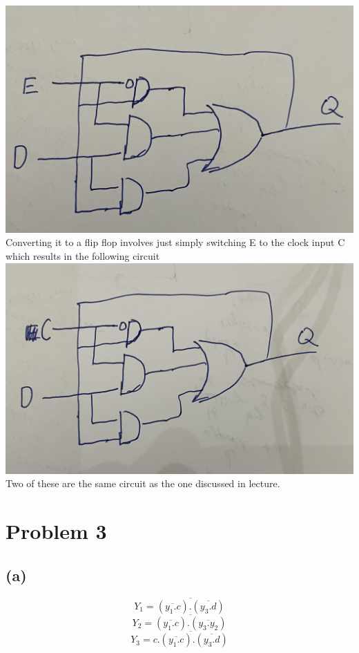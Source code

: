 \documentclass[12pt]{article}
\begin{document}
\includegraphics[scale=0.25]{Fig4.jpg}\\
Converting it to a flip flop involves just simply switching
E to the clock input C which results in the following circuit\\
\includegraphics[scale=0.25]{Fig5.jpg}\\

Two of these are the same circuit as the one discussed in lecture.
\section*{Problem 3}
\subsection*{(a)}
$$Y_1=\overline{(\overline{y_1.c}).(\overline{y_3.d})}$$
$$Y_2=\overline{(\overline{y_1.c}).(\overline{y_3.y_2})}$$
$$Y_3=\overline{c.(\overline{y_1.c}).(\overline{y_3.d})}$$
\end{document}
